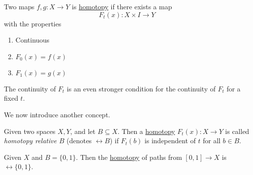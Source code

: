 \begin{prev}
	Two maps \(f, g\colon X\to Y\) is \hyperref[def:homotopy]{homotopy} if there exists a map
	\[
		F_t(x)\colon X\times I\to Y
	\]
	with the properties
	\begin{enumerate}[(1)]
		\item Continuous
		\item \(F_0(x) = f(x)\)
		\item \(F_1(x) = g(x)\)
	\end{enumerate}
	\begin{remark}
		The continuity of \(F_t\) is an even stronger condition for the continuity of \(F_t\) for a fixed \(t\).
	\end{remark}
\end{prev}

We now introduce another concept.
\begin{definition}\label{def:homotopy-relative}
	Given two spaces \(X, Y\), and let \(B\subseteq X\). Then a \hyperref[def:homotopy]{homotopy} \(F_t(x)\colon X\to Y\) is called
	\emph{homotopy relative \(B\)} (denotes \(\rel B\)) if \(F_t(b)\) is independent of \(t\) for all \(b\in B\).
\end{definition}

\begin{eg}
	Given \(X\) and \(B = \{0, 1\}\). Then the \hyperref[def:homotopy]{homotopy} of paths from \([0, 1]\to X\) is
	\(\rel \{0, 1\}\).
	\begin{center}
	\end{center}
\end{eg}

